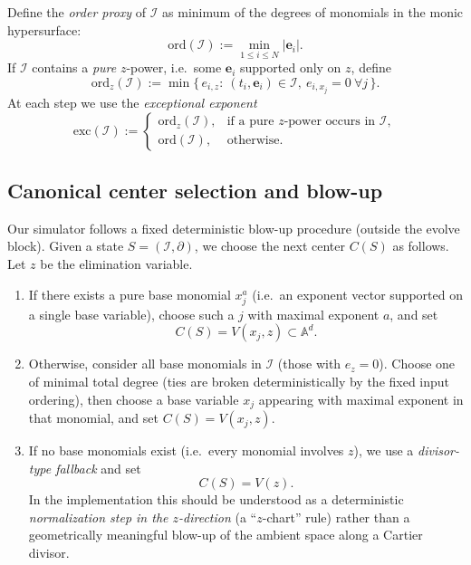 \documentclass[11pt]{amsart}
\begin{document}
Define the \emph{order proxy} of $\mathcal{I}$ as minimum of the degrees of monomials in the monic hypersurface:
\[
\mathrm{ord}(\mathcal{I}) := \min_{1\le i\le N} |\mathbf{e}_i|.
\]
If $\mathcal{I}$ contains a \emph{pure} $z$-power, i.e.\ some $\mathbf{e}_i$ supported only on $z$, define
\[
\mathrm{ord}_z(\mathcal{I}):=\min\{\,e_{i,z}:\ (t_i,\mathbf{e}_i)\in\mathcal{I},\ e_{i,x_j}=0\ \forall j\,\}.
\]
At each step we use the \emph{exceptional exponent}
\begin{equation}\label{exc}
\mathrm{exc}(\mathcal{I}):=
\begin{cases}
\mathrm{ord}_z(\mathcal{I}), & \text{if a pure }z\text{-power occurs in }\mathcal{I},\\
\mathrm{ord}(\mathcal{I}),   & \text{otherwise}.
\end{cases}
\end{equation}


\subsection{Canonical center selection and blow-up}

Our simulator follows a fixed deterministic blow-up procedure (outside the evolve block). 
Given a state $S=(\mathcal I,\partial)$, we choose the next center $C(S)$ as follows.
Let $z$ be the elimination variable.
\begin{enumerate}[leftmargin=*]
\item If there exists a pure base monomial $x_j^{a}$ (i.e.\ an exponent vector supported on a single base variable), 
      choose such a $j$ with maximal exponent $a$, and set
      \[
      C(S)=V(x_j,z)\subset \mathbb{A}^d.
      \]
\item Otherwise, consider all base monomials in $\mathcal I$ (those with $e_z=0$). Choose one of minimal total degree 
      (ties are broken deterministically by the fixed input ordering), then choose a base variable $x_j$ appearing with maximal exponent 
      in that monomial, and set $C(S)=V(x_j,z)$.
\item If no base monomials exist (i.e.\ every monomial involves $z$), we use a \emph{divisor-type fallback} and set
      \[
      C(S)=V(z).
      \]
      In the implementation this should be understood as a deterministic \emph{normalization step in the $z$-direction} (a ``$z$-chart'' rule)
      rather than a geometrically meaningful blow-up of the ambient space along a Cartier divisor.
\end{enumerate}
\end{document}
